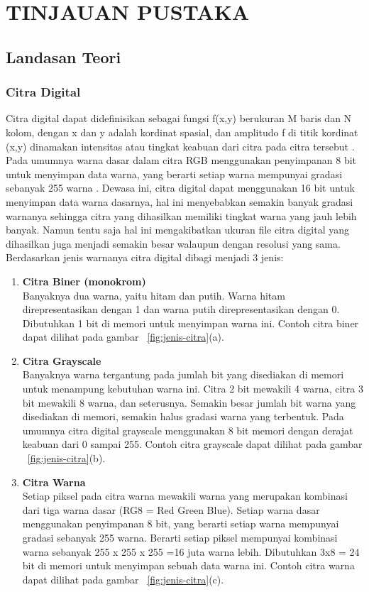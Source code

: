 
\chapter{TINJAUAN PUSTAKA}


\section{Landasan Teori}

\subsection{Citra Digital}
Citra digital dapat didefinisikan sebagai fungsi f(x,y) berukuran M baris dan N kolom, dengan x dan y adalah kordinat spasial, dan amplitudo f di titik kordinat (x,y) dinamakan intensitas atau tingkat keabuan dari citra pada citra tersebut . Pada umumnya warna dasar dalam citra RGB menggunakan penyimpanan 8 bit untuk menyimpan data warna, yang berarti setiap warna mempunyai gradasi sebanyak 255 warna . Dewasa ini, citra digital dapat menggunakan 16 bit untuk menyimpan data warna dasarnya, hal ini menyebabkan semakin banyak gradasi warnanya sehingga citra yang dihasilkan memiliki tingkat warna yang jauh lebih banyak. Namun tentu saja hal ini mengakibatkan ukuran file citra digital yang dihasilkan juga menjadi semakin besar walaupun dengan resolusi yang sama. Berdasarkan jenis warnanya citra digital dibagi menjadi 3 jenis:

\begin{enumerate} [label=\textbf{\alph*.}]
    \item \textbf{Citra Biner (monokrom)} \\ 
    Banyaknya dua warna, yaitu hitam dan putih. Warna hitam direpresentasikan dengan 1 dan warna putih direpresentasikan dengan 0. Dibutuhkan 1 bit di memori untuk menyimpan warna ini. Contoh citra biner dapat dilihat pada gambar ~\ref{fig:jenis-citra}(a).
    \item \textbf{Citra Grayscale} \\ 
    Banyaknya warna tergantung pada jumlah bit yang disediakan di memori untuk menampung kebutuhan warna ini. Citra 2 bit mewakili 4 warna, citra 3 bit mewakili 8 warna, dan seterusnya. Semakin besar jumlah bit warna yang disediakan di memori, semakin halus gradasi warna yang terbentuk. Pada umumnya citra digital grayscale menggunakan 8 bit memori dengan derajat keabuan dari 0 sampai 255. Contoh citra grayscale dapat dilihat pada gambar ~\ref{fig:jenis-citra}(b).
    \item \textbf{Citra Warna} \\ 
    Setiap piksel pada citra warna mewakili warna yang merupakan kombinasi dari tiga warna dasar (RG8 = Red Green Blue). Setiap warna dasar menggunakan penyimpanan 8 bit, yang berarti setiap warna mempunyai gradasi sebanyak 255 warna. Berarti setiap piksel mempunyai kombinasi warna sebanyak 255 x 255 x 255 =16 juta warna lebih. Dibutuhkan 3x8 = 24 bit di memori untuk menyimpan sebuah data warna ini. Contoh citra warna dapat dilihat pada gambar ~\ref{fig:jenis-citra}(c).
\end{enumerate}

